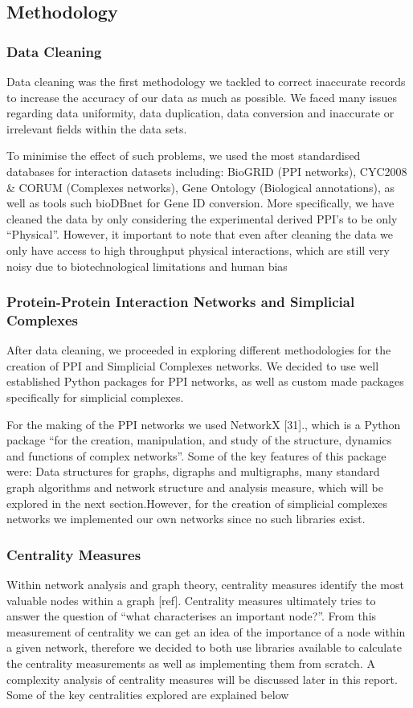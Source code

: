 \documentclass[9pt]{article}
\begin{document}
\subsection{Methodology}
\subsubsection{Data Cleaning}
Data cleaning was the first methodology we tackled to correct inaccurate records to increase the accuracy of our data as much as possible. We faced many issues regarding data uniformity, data duplication, data conversion and inaccurate or irrelevant fields within the data sets. 
\par
To minimise the effect of such problems, we used the most standardised databases for interaction datasets including: BioGRID (PPI networks), CYC2008 \& CORUM (Complexes networks), Gene Ontology (Biological annotations), as well as tools such bioDBnet for Gene ID conversion. More specifically, we have cleaned the data by only considering the experimental derived PPI’s to be only “Physical”. However, it important to note that even after cleaning the data we only have access to high throughput physical interactions, which are still very noisy due to biotechnological limitations and human bias

\subsubsection{Protein-Protein Interaction Networks and Simplicial Complexes}
After data cleaning, we proceeded in exploring different methodologies for the creation of PPI and Simplicial Complexes networks. We decided to use well established Python packages for PPI networks, as well as custom made packages specifically for simplicial complexes.
\par
For the making of the PPI networks we used NetworkX [31]., which is a Python package “for the creation, manipulation, and study of the structure, dynamics and functions of complex networks”. Some of the key features of this package were: Data structures for graphs, digraphs and multigraphs, many standard graph algorithms and network structure and analysis measure, which will be explored in the next section.However, for the creation of simplicial complexes networks we implemented our own networks since no such libraries exist. 

\subsubsection{Centrality Measures}
Within network analysis and graph theory, centrality measures identify the most valuable nodes within a graph [ref]. Centrality measures ultimately tries to answer the question of  “what characterises an important node?”. From this measurement of centrality we can get an idea of the importance of a node within a given network, therefore we decided to both use libraries available to calculate the centrality measurements as well as implementing them from scratch. A complexity analysis of centrality measures will be discussed later in this report. Some of the key centralities explored are explained below
\end{document}

